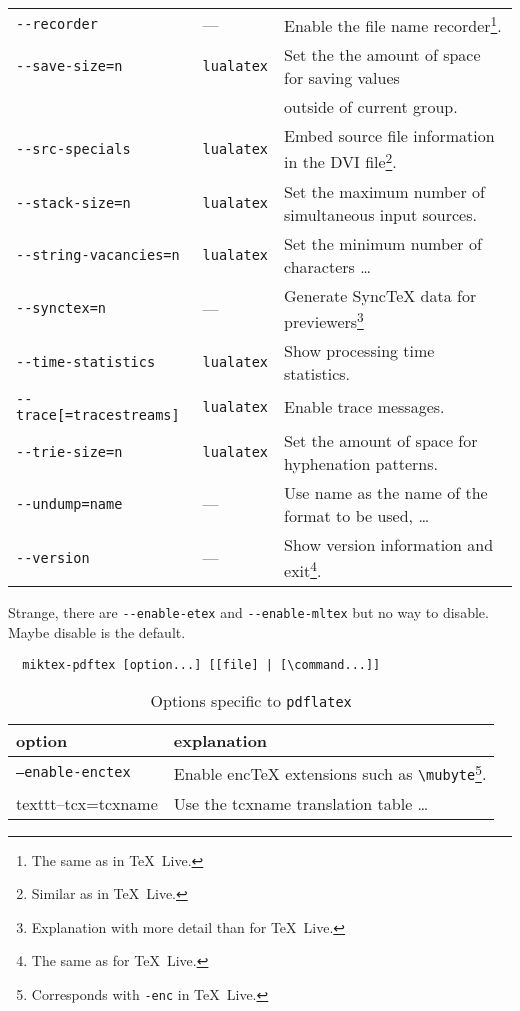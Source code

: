 \documentclass{article}
\newcommand{\pdflatex}{\texttt{pdflatex}}
\newcommand{\lualatex}{\texttt{lualatex}}
\newcommand{\texlive}{\TeX~Live}
\begin{document}
{\begin{longtable}{|lll|}
\texttt{-{}-recorder}                & ---         & Enable the file name recorder\footnote%
{The same as in \texlive. }. \\
\texttt{-{}-save-size=n}             & \lualatex{} & Set the the amount of space for saving values \\
                                     &             & outside of current group. \\
\texttt{-{}-src-specials}            & \lualatex{} & Embed source file information in the DVI file\footnote%
{Similar as in \texlive. }. \\
\texttt{-{}-stack-size=n}            & \lualatex{} & Set the maximum number of simultaneous input sources. \\
\texttt{-{}-string-vacancies=n}      & \lualatex{} & Set the minimum number of characters \dots \\
\texttt{-{}-synctex=n}               & ---         & Generate SyncTeX data for previewers\footnote%
{Explanation with more detail than for \texlive. } \\
\texttt{-{}-time-statistics}         & \lualatex{} & Show processing time statistics. \\
\texttt{-{}-trace[=tracestreams]}    & \lualatex{} & Enable trace messages. \\
\texttt{-{}-trie-size=n}             & \lualatex{} & Set the amount of space for hyphenation patterns. \\
\texttt{-{}-undump=name}             & ---         & Use name as the name of the format to be used, \dots \\
\texttt{-{}-version}                 & ---         & Show version information and exit\footnote%
{The same as for \texlive. }. \\
\end{longtable}
}

Strange, there are \texttt{-{}-enable-etex} and \texttt{-{}-enable-mltex} 
but no way to disable. 
Maybe disable is the default. 

\begin{verbatim}
  miktex-pdftex [option...] [[file] | [\command...]]
\end{verbatim}

\begin{longtable}{|ll|}
  \toprule
  option & explanation \\
  \midrule
  \midrule
  \endfirsthead%
  \bottomrule
  \caption{\label{tab:latexOptionsPdflatexMiktex} Options specific to \pdflatex{} }
  \endlastfoot%
  \texttt{--enable-enctex} & Enable encTeX extensions such as \texttt{\textbackslash{}mubyte}\footnote%
  {Corresponds with \texttt{-enc} in \texlive. }. \\
  texttt{--tcx=tcxname}    & Use the tcxname translation table \dots \\
  \end{longtable}
\end{document}
